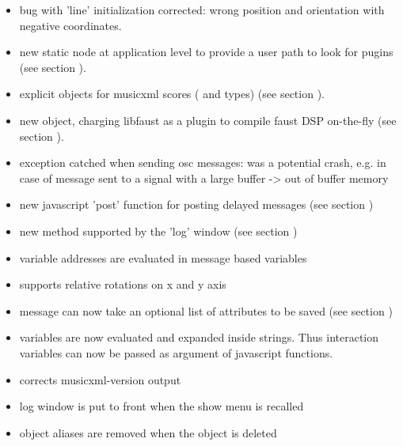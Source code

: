 \begin{itemize}
\item bug with 'line' initialization corrected: wrong position and orientation with negative coordinates.
\item new  static node at application level to provide a user path to look for pugins (see section ).
\item explicit objects for musicxml scores ( and  types) (see section ).
\item new  object, charging libfaust as a plugin to compile faust DSP on-the-fly (see section ).
\item exception catched when sending osc messages: was a potential crash, 
  e.g. in case of  message sent to a signal with a large buffer -> out of buffer memory
\item new javascript 'post' function for posting delayed messages  (see section )
\item new  method supported by the 'log' window (see section )
\item variable addresses are evaluated in message based variables
\item supports relative rotations on x and y axis
\end{itemize}

\begin{itemize}
\item {} message can now take an optional list of attributes to be saved  (see section )
\item variables are now evaluated and expanded inside strings. Thus interaction variables can now be passed as argument of javascript functions.
\item corrects musicxml-version output
\item log window is put to front when the show menu is recalled
\item object aliases are removed when the object is deleted
\end{itemize}

